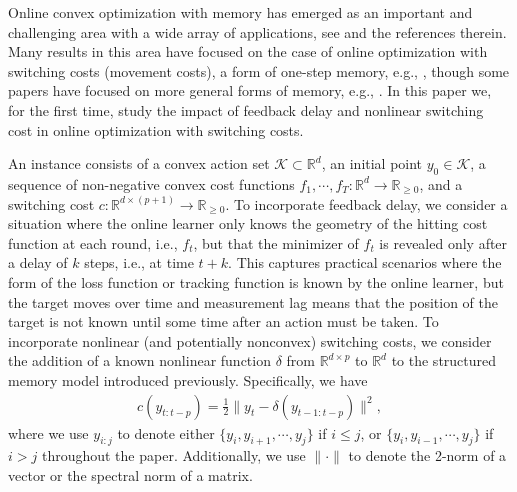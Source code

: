 Online convex optimization with memory has emerged as an important and challenging area with a wide array of applications, see \citep{lin2012online,anava2015online,chen2018smoothed,goel2019beyond,agarwal2019online,bubeck2019competitively} and the references therein.  Many results in this area have focused on the case of online optimization with switching costs (movement costs), a form of one-step memory, e.g., \citep{chen2018smoothed,goel2019beyond,bubeck2019competitively}, though some papers have focused on more general forms of memory, e.g., \citep{anava2015online,agarwal2019online}. In this paper we, for the first time, study the impact of feedback delay and nonlinear switching cost in online optimization with switching costs. 

An instance consists of a convex action set $\mathcal{K}\subset\mathbb{R}^d$, an initial point $y_0\in\mathcal{K}$, a sequence of non-negative convex cost functions $f_1,\cdots,f_T:\mathbb{R}^d\to\mathbb{R}_{\ge0}$, and a switching cost $c:\mathbb{R}^{d\times(p+1)}\to\mathbb{R}_{\ge0}$. To incorporate feedback delay, we consider a situation where the online learner only knows the geometry of the hitting cost function at each round, i.e., $f_t$, but that the minimizer of $f_t$ is revealed only after a delay of $k$ steps, i.e., at time $t+k$.  This captures practical scenarios where the form of the loss function or tracking function is known by the online learner, but the target moves over time and measurement lag means that the position of the target is not known until some time after an action must be taken. 
To incorporate nonlinear (and potentially nonconvex) switching costs, we consider the addition of a known nonlinear function $\delta$ from $\mathbb{R}^{d\times p}$ to $\mathbb{R}^d$ to the structured memory model introduced previously.  Specifically, we have
\begin{align}
c(y_{t:t-p}) = \frac{1}{2}\|y_t-\delta(y_{t-1:t-p})\|^2,    \label{e.newswitching}
\end{align}
where we use $y_{i:j}$ to denote either $\{y_i, y_{i+1}, \cdots, y_j\}$ if $i\leq j$, or  $\{y_i, y_{i-1}, \cdots, y_j\}$ if $i > j$ throughout the paper. Additionally, we use $\|\cdot\|$ to denote the 2-norm of a vector or the spectral norm of a matrix.


